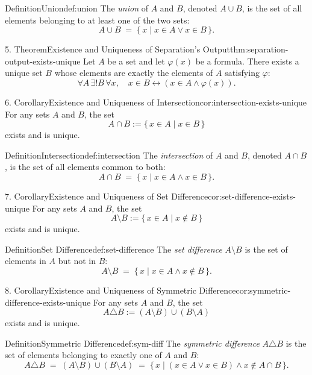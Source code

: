 \documentclass[11pt]{article}
\begin{document}
\begin{studyblock}{Definition}{Union}{def:union}
The \emph{union} of $A$ and $B$, denoted $A \cup B$, is the set of all
elements belonging to at least one of the two sets:
\[
A \cup B \;=\; \{\, x \mid x \in A \lor x \in B \,\}.
\]
\end{studyblock}
\begin{studyblock}{5. Theorem}{Existence and Uniqueness of Separation's Output}{thm:separation-output-exists-unique}
Let $A$ be a set and let $\varphi(x)$ be a formula. There exists a unique set
$B$ whose elements are exactly the elements of $A$ satisfying $\varphi$:
\[
  \forall A\,\exists! B\,\forall x,\quad
  x\in B\leftrightarrow (x\in A\wedge \varphi(x)).
\]
\end{studyblock}
\begin{studyblock}{6. Corollary}{Existence and Uniqueness of Intersection}{cor:intersection-exists-unique}
For any sets $A$ and $B$, the set
\[
  A\cap B:=\{\,x\in A\mid x\in B\,\}
\]
exists and is unique.
\end{studyblock}
\begin{studyblock}{Definition}{Intersection}{def:intersection}
The \emph{intersection} of $A$ and $B$, denoted $A \cap B$, is the set of all
elements common to both:
\[
A \cap B \;=\; \{\, x \mid x \in A \land x \in B \,\}.
\]
\end{studyblock}
\begin{studyblock}{7. Corollary}{Existence and Uniqueness of Set Difference}{cor:set-difference-exists-unique}
For any sets $A$ and $B$, the set
\[
  A\setminus B:=\{\,x\in A\mid x\notin B\,\}
\]
exists and is unique.
\end{studyblock}
\begin{studyblock}{Definition}{Set Difference}{def:set-difference}
The \emph{set difference} $A \setminus B$ is the set of elements in $A$ but
not in $B$:
\[
A \setminus B \;=\; \{\, x \mid x \in A \land x \notin B \,\}.
\]
\end{studyblock}
\begin{studyblock}{8. Corollary}{Existence and Uniqueness of Symmetric Difference}{cor:symmetric-difference-exists-unique}
For any sets $A$ and $B$, the set
\[
  A\triangle B:=(A\setminus B)\cup(B\setminus A)
\]
exists and is unique.
\end{studyblock}
\begin{studyblock}{Definition}{Symmetric Difference}{def:sym-diff}
The \emph{symmetric difference} $A \triangle B$ is the set of elements
belonging to exactly one of $A$ and $B$:
\[
A \triangle B
\;=\;
(A \setminus B) \cup (B \setminus A)
\;=\;
\{\, x \mid (x \in A \lor x \in B) \land x \notin A \cap B \,\}.
\]
\end{studyblock}
\end{document}
